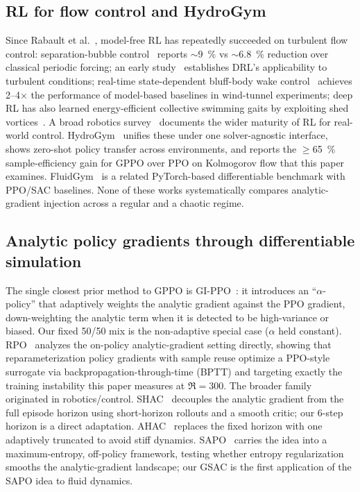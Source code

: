 \subsection{RL for flow control and HydroGym}
Since Rabault et al.~\cite{rabault2019}, model-free RL has repeatedly
succeeded on turbulent flow control: separation-bubble
control~\cite{font2025} reports $\sim$\SI{9}{\percent} vs $\sim$\SI{6.8}{\percent}
reduction over classical periodic forcing; an early study~\cite{turbdrl2020}
establishes DRL's applicability to turbulent conditions; real-time
state-dependent bluff-body wake control~\cite{react2026} achieves 2--4$\times$
the performance of model-based baselines in wind-tunnel experiments; deep RL
has also learned energy-efficient collective swimming gaits by exploiting
shed vortices~\cite{verma2018vortices}. A broad
robotics survey~\cite{drlrobotics2025} documents the wider maturity of RL
for real-world control. HydroGym~\cite{hydrogym2026} unifies these under one
solver-agnostic interface, shows zero-shot policy transfer across
environments, and reports the $\ge$\SI{65}{\percent} sample-efficiency gain
for GPPO over PPO on Kolmogorov flow that this paper examines.
FluidGym~\cite{fluidgym2026} is a related PyTorch-based differentiable
benchmark with PPO/SAC baselines. None of these works systematically
compares analytic-gradient injection across a regular and a chaotic regime.

\subsection{Analytic policy gradients through differentiable simulation}
The single closest prior method to GPPO is GI-PPO~\cite{gippo2023}:
it introduces an ``$\alpha$-policy'' that adaptively weights the analytic
gradient against the PPO gradient, down-weighting the analytic term when it
is detected to be high-variance or biased. Our fixed 50/50 mix is the
non-adaptive special case ($\alpha$ held constant). RPO~\cite{rpo2025}
analyzes the on-policy analytic-gradient setting directly, showing that
reparameterization policy gradients with sample reuse optimize a PPO-style
surrogate via backpropagation-through-time (BPTT) and targeting exactly the
training instability this paper measures at $\Re=300$.
The broader family originated in robotics/control. SHAC~\cite{shac2022}
decouples the analytic gradient from the full episode horizon using
short-horizon rollouts and a smooth critic; our 6-step horizon is a direct
adaptation. AHAC~\cite{ahac2024} replaces the fixed horizon with
one adaptively truncated to avoid stiff dynamics. SAPO~\cite{sapo2025}
carries the idea into a maximum-entropy, off-policy framework, testing
whether entropy regularization smooths the analytic-gradient landscape; our
GSAC is the first application of the SAPO idea to fluid dynamics.

